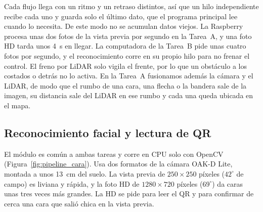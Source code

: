 \documentclass[11pt,a4paper]{article}
\begin{document}
Cada flujo llega con un ritmo y un retraso distintos, así que un hilo independiente recibe cada uno y guarda solo el último dato, que el programa principal lee cuando lo necesita. De este modo no se acumulan datos viejos. La Raspberry procesa unas dos fotos de la vista previa por segundo en la Tarea~A, y una foto HD tarda unos \SI{4}{\second} en llegar. La computadora de la Tarea~B pide unas cuatro fotos por segundo, y el reconocimiento corre en su propio hilo para no frenar el control. El freno por LiDAR solo vigila el frente, por lo que un obstáculo a los costados o detrás no lo activa. En la Tarea~A fusionamos además la cámara y el LiDAR, de modo que el rumbo de una cara, una flecha o la bandera sale de la imagen, su distancia sale del LiDAR en ese rumbo y cada una queda ubicada en el mapa.

\subsection{Reconocimiento facial y lectura de QR}

El módulo es común a ambas tareas y corre en CPU solo con OpenCV (Figura~\ref{fig:pipeline_cara}). Usa dos formatos de la cámara OAK-D Lite, montada a unos \SI{13}{\centi\meter} del suelo. La vista previa de $250\times250$ píxeles ($42^\circ$ de campo) es liviana y rápida, y la foto HD de $1280\times720$ píxeles ($69^\circ$) da caras unas tres veces más grandes. La HD se pide para leer el QR y para confirmar de cerca una cara que salió chica en la vista previa.
\end{document}
